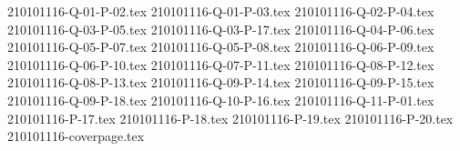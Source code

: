 \documentclass{article}                              %
\begin{document}
{210101116-Q-01-P-02.tex}
{210101116-Q-01-P-03.tex}
{210101116-Q-02-P-04.tex}
{210101116-Q-03-P-05.tex}
{210101116-Q-03-P-17.tex}
{210101116-Q-04-P-06.tex}
{210101116-Q-05-P-07.tex}
{210101116-Q-05-P-08.tex}
{210101116-Q-06-P-09.tex}
{210101116-Q-06-P-10.tex}
{210101116-Q-07-P-11.tex}
{210101116-Q-08-P-12.tex}
{210101116-Q-08-P-13.tex}
{210101116-Q-09-P-14.tex}
{210101116-Q-09-P-15.tex}
{210101116-Q-09-P-18.tex}
{210101116-Q-10-P-16.tex}
{210101116-Q-11-P-01.tex}
{210101116-P-17.tex}
{210101116-P-18.tex}
{210101116-P-19.tex}
{210101116-P-20.tex}
{210101116-coverpage.tex}
\end{document}

